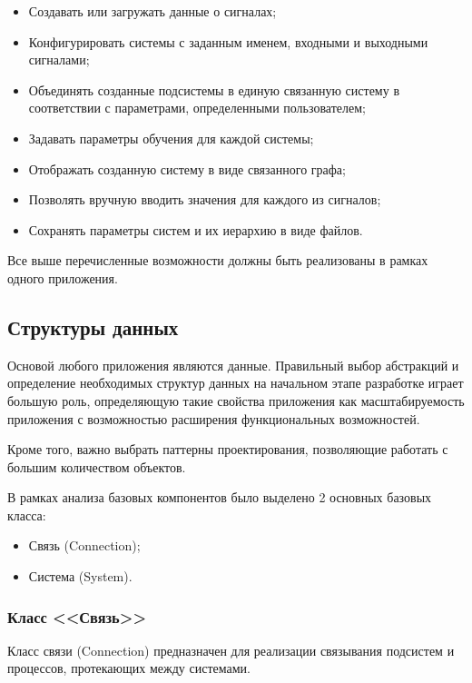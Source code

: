 \begin{itemize}
  \item Создавать или загружать данные о сигналах;
  \item Конфигурировать системы с заданным именем, входными и выходными
    сигналами;
  \item Объединять созданные подсистемы в единую связанную систему в
    соответствии с параметрами, определенными пользователем;
  \item Задавать параметры обучения для каждой системы;
  \item Отображать созданную систему в виде связанного графа;
  \item Позволять вручную вводить значения для каждого из сигналов;
  \item Сохранять параметры систем и их иерархию в виде файлов.
\end{itemize}

Все выше перечисленные возможности должны быть реализованы в рамках одного приложения.


\subsection{Структуры данных}
Основой любого приложения являются данные. Правильный выбор абстракций и определение необходимых структур данных на начальном этапе разработке играет большую роль, определяющую такие свойства приложения как масштабируемость приложения с возможностью расширения функциональных возможностей. 

Кроме того, важно выбрать паттерны проектирования, позволяющие работать с большим количеством объектов. 

В рамках анализа базовых компонентов было выделено 2 основных базовых класса: 

\begin{itemize}
  \item Связь (Connection);
  \item Система (System). 
\end{itemize}

\subsubsection{Класс <<Связь>>}

Класс связи (Connection) предназначен для реализации связывания подсистем и процессов, протекающих между системами. 

